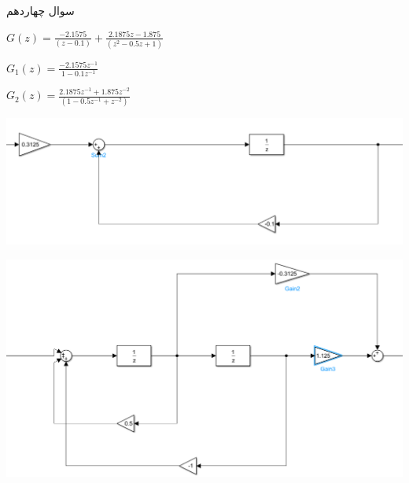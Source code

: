 \documentclass{article}
\begin{document}
\begin{problem}{سوال چهاردهم}
	\raggedleft
	
    $G(z) = \frac{-2.1575}{(z-0.1)} + \frac{2.1875z-1.875}{(z^2-0.5z+1)}$
    
    
    $G_1(z) = \frac{-2.1575z^{-1}}{1 - 0.1z^{-1}}$
    
    $G_2(z) = \frac{2.1875z^{-1}+ 1.875z^{-2}}{(1-0.5z^{-1}+z^{-2})}$
    
    \includegraphics[width=\linewidth]{Second Series/14.png}
    
    \includegraphics[width=\linewidth]{Second Series/15.png}
    
    
	
\end{problem}
\end{document}
